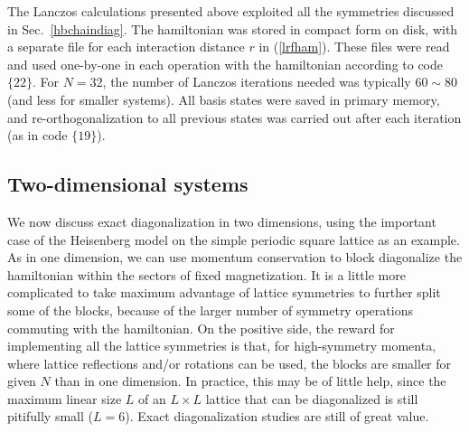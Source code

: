 \documentclass[draft,numberedheadings]{aipproc}
\begin{document}
The Lanczos calculations presented above exploited all the symmetries discussed in Sec.~\ref{hbchaindiag}. The hamiltonian was stored in compact form on 
disk, with a separate file for each interaction distance $r$ in (\ref{lrfham}). These files were read and used one-by-one in each operation with the 
hamiltonian according to code $\{22\}$. For $N=32$, the number of Lanczos iterations needed was typically $60 \sim 80$ (and less for smaller systems). 
All basis states were saved in primary memory, and re-orthogonalization to all previous states was carried out after each iteration (as in code $\{19\}$).


\subsection{Two-dimensional systems}
\label{sec_twodim}

We now discuss exact diagonalization in two dimensions, using the important case of the Heisenberg model on the simple periodic square lattice as 
an example. As in one dimension, we can use momentum conservation to block diagonalize the hamiltonian within the sectors of fixed magnetization. It is a 
little more complicated to take maximum advantage of lattice symmetries to further split some of the blocks, because of the larger number of symmetry 
operations commuting with the hamiltonian. On the positive side, the reward for implementing all the lattice symmetries is that, for high-symmetry 
momenta, where lattice reflections and/or rotations can be used, the blocks are smaller for given $N$ than in one dimension. In practice, this 
may be of little help, since the maximum linear size $L$ of an $L\times L$ lattice that can be diagonalized is still pitifully small ($L=6$). 
Exact diagonalization studies are still of great value.
\end{document}
